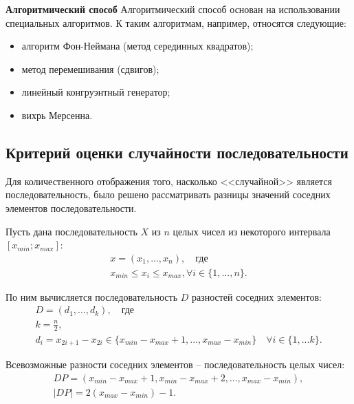 \documentclass[14pt, a4paper]{extarticle}
\begin{document}
\textbf{Алгоритмический способ}
Алгоритмический способ основан на использовании специальных алгоритмов. К таким алгоритмам, например, относятся следующие:

\begin{itemize}
	\item алгоритм Фон-Неймана (метод серединных квадратов);
	\item метод перемешивания (сдвигов);
	\item линейный конгруэнтный генератор;
	\item вихрь Мерсенна.
\end{itemize}



\subsection{Критерий оценки случайности последовательности}

Для количественного отображения того, насколько <<случайной>> является последовательность, было решено рассматривать разницы значений соседних элементов последовательности. 

Пусть дана последовательность $X$ из $n$ целых чисел из некоторого интервала $[x_{min}; x_{max}]$:
\begin{equation}
	\begin{gathered}
		x = \left(x_1, ..., x_n\right), \quad \text{где} \\
		x_{min} \leq x_i \leq x_{max}, \forall i \in \{1, ..., n\}.
	\end{gathered}
\end{equation}

По ним вычисляется последовательность $D$ разностей соседних элементов:
\begin{equation}
	\begin{gathered}
	D = \left(d_1, ..., d_k\right), \quad \text{где} \\
	k = \frac{n}{2},\\
	d_i = x_{2i + 1} - x_{2i} \in \{x_{min} - x_{max} + 1, ..., x_{max} - x_{min}\} \quad \forall i \in \{1, ... k\}.
	\end{gathered}
\end{equation}

Всевозможные разности соседних элементов -- последовательность целых чисел:
\begin{equation}
	\begin{gathered}
		DP = \left(x_{min} - x_{max} + 1, x_{min} - x_{max} + 2, ..., x_{max} - x_{min}\right), \\
		\lvert DP \lvert = 2\left(x_{max} - x_{min}\right) - 1.
	\end{gathered}
\end{equation}
\end{document}
